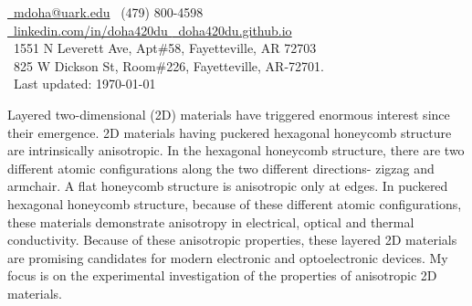 \documentclass{HD_resume}
\begin{document}
\small
\smallskip
\vspace*{-44pt}

{\href{mailto:mdoha@uark.edu}{\faEnvelope~mdoha@uark.edu}  \faMobile~(479) 800-4598 \\}
{\href{https://linkedin.com/in/doha420du }{\faLinkedinSquare~linkedin.com/in/doha420du }  \href{https://doha420du.github.io}{\faGithubSquare~doha420du.github.io} \\ \faHome~1551 N Leverett Ave, Apt\#58, Fayetteville, AR 72703 \\ \faBriefcase~825 W Dickson St, Room\#226, Fayetteville, AR-72701.\\%
\faHistory~Last updated: \today \\
}




\vspace{15pt}
Layered two-dimensional (2D) materials have triggered enormous interest since their emergence. 2D materials having puckered hexagonal honeycomb structure are intrinsically anisotropic. In the hexagonal honeycomb structure, there are two different atomic configurations along the two different directions- zigzag and armchair. A flat honeycomb structure is anisotropic only at edges. In puckered hexagonal honeycomb structure, because of these different atomic configurations, these materials demonstrate anisotropy in electrical, optical and thermal conductivity. Because of these anisotropic properties, these layered 2D materials are promising candidates for modern electronic and optoelectronic devices. My focus is on the experimental investigation of the properties of anisotropic 2D materials.
\end{document}
